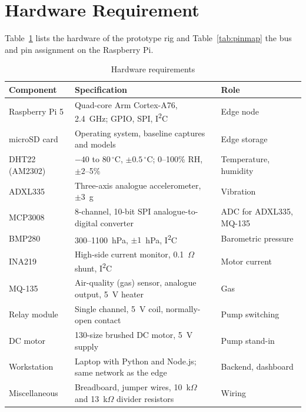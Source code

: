 \section{Hardware Requirement}

Table~\ref{tab:hardware} lists the hardware of the prototype rig and Table~\ref{tab:pinmap} the bus and pin assignment on the Raspberry Pi.

\begin{table}[htbp]
\centering
\caption{Hardware requirements}
\label{tab:hardware}
\small
\begin{tabularx}{\textwidth}{@{}l X l@{}}
\toprule
\textbf{Component} & \textbf{Specification} & \textbf{Role} \\
\midrule
Raspberry Pi 5 & Quad-core Arm Cortex-A76, 2.4~GHz; GPIO, SPI, I\textsuperscript{2}C & Edge node \\
microSD card & Operating system, baseline captures and models & Edge storage \\
DHT22 (AM2302) & $-40$ to $80\,^{\circ}$C, $\pm 0.5\,^{\circ}$C; 0--100\% RH, $\pm 2$--5\% & Temperature, humidity \\
ADXL335 & Three-axis analogue accelerometer, $\pm 3$~g & Vibration \\
MCP3008 & 8-channel, 10-bit SPI analogue-to-digital converter & ADC for ADXL335, MQ-135 \\
BMP280 & 300--1100~hPa, $\pm 1$~hPa, I\textsuperscript{2}C & Barometric pressure \\
INA219 & High-side current monitor, 0.1~$\Omega$ shunt, I\textsuperscript{2}C & Motor current \\
MQ-135 & Air-quality (gas) sensor, analogue output, 5~V heater & Gas \\
Relay module & Single channel, 5~V coil, normally-open contact & Pump switching \\
DC motor & 130-size brushed DC motor, 5~V supply & Pump stand-in \\
Workstation & Laptop with Python and Node.js; same network as the edge & Backend, dashboard \\
Miscellaneous & Breadboard, jumper wires, 10~k$\Omega$ and 13~k$\Omega$ divider resistors & Wiring \\
\bottomrule
\end{tabularx}
\end{table}

